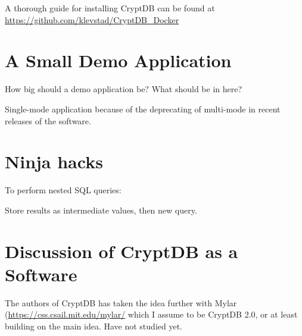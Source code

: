 A thorough guide for installing CryptDB can be found at \url{https://github.com/klevstad/CryptDB_Docker}

\section{A Small Demo Application}

How big should a demo application be? What should be in here?

Single-mode application because of the deprecating of multi-mode in recent releases of the software.

\section{Ninja hacks}

To perform nested SQL queries:

Store results as intermediate values, then new query.



\section{Discussion of CryptDB as a Software}

The authors of CryptDB has taken the idea further with Mylar (\url{https://css.csail.mit.edu/mylar/} which I assume to be CryptDB 2.0, or at least building on the main idea. Have not studied yet.